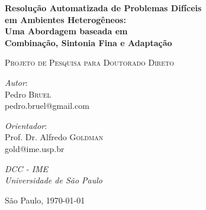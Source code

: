 \documentclass[a4paper, 11pt]{article}
\begin{document}
\hypersetup{backref,pdfpagemode=FullScreen,colorlinks=true}

\thispagestyle{empty}
\begin{center}
    \vspace*{4cm}
    \textbf{\Large{Resolução Automatizada de Problemas Difíceis \\ em Ambientes Heterogêneos: \\ Uma Abordagem baseada em \\ Combinação, Sintonia Fina e Adaptação}}\\

    \vskip 1cm

    \textsc{Projeto de Pesquisa para Doutorado Direto}

    \vskip 3cm

    \begin{minipage}{.4\linewidth}
        \begin{flushleft}
            \emph{Autor}: \\Pedro \textsc{Bruel}\\
            pedro.bruel@gmail.com
        \end{flushleft}
    \end{minipage}
    \begin{minipage}{.4\linewidth}
        \begin{flushright}
            \emph{Orientador}: \\Prof. Dr. Alfredo \textsc{Goldman}\\
            gold@ime.usp.br
        \end{flushright}
    \end{minipage}

    \vskip 1cm

    \normalsize{\emph{DCC - IME\\
    Universidade de São Paulo}\\}


    \vfill
    \normalsize{São Paulo, \today}
\end{center}

\newpage
\end{document}
